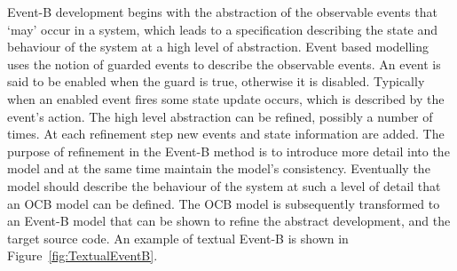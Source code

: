 Event-B development begins with the abstraction of the observable events that `may' occur in a system, which leads to a specification describing the state and behaviour of the system at a high level of abstraction. Event based modelling uses the notion of guarded events to describe the observable events. An event is said to be enabled when the guard is true, otherwise it is disabled. Typically when an enabled event fires some state update occurs, which is described by the event's action. The high level abstraction can be refined, possibly a number of times. At each refinement step new events and state information are added. The purpose of refinement in the Event-B method is to introduce more detail into the model and at the same time maintain the model's consistency. Eventually the model should describe the behaviour of the system at such a level of detail that an OCB model can be defined. The OCB model is subsequently transformed to an Event-B model that can be shown to refine the abstract development, and the target source code. An example of textual Event-B is shown in Figure~\ref{fig:TextualEventB}.
%
\sffamily

